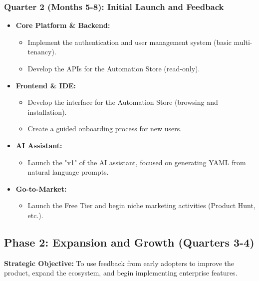 \documentclass[11pt, a4paper, oneside]{article}
\begin{document}
\subsubsection*{Quarter 2 (Months 5-8): Initial Launch and Feedback}
\begin{itemize}[leftmargin=*]
    \item \textbf{Core Platform \& Backend:}
    \begin{itemize}
        \item Implement the authentication and user management system (basic multi-tenancy).
        \item Develop the APIs for the Automation Store (read-only).
    \end{itemize}
    \item \textbf{Frontend \& IDE:}
    \begin{itemize}
        \item Develop the interface for the Automation Store (browsing and installation).
        \item Create a guided onboarding process for new users.
    \end{itemize}
    \item \textbf{AI Assistant:}
    \begin{itemize}
        \item Launch the "v1" of the AI assistant, focused on generating YAML from natural language prompts.
    \end{itemize}
    \item \textbf{Go-to-Market:}
    \begin{itemize}
        \item Launch the Free Tier and begin niche marketing activities (Product Hunt, etc.).
    \end{itemize}
\end{itemize}

\clearpage

\subsection{Phase 2: Expansion and Growth (Quarters 3-4)}
\textbf{Strategic Objective:} To use feedback from early adopters to improve the product, expand the ecosystem, and begin implementing enterprise features.
\end{document}
